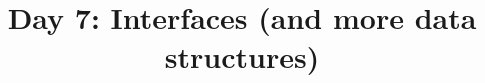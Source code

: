 \documentclass{article}
\begin{document}
\title{Day 7: Interfaces (and more data structures)}
\date{}
\maketitle


\end{document}
